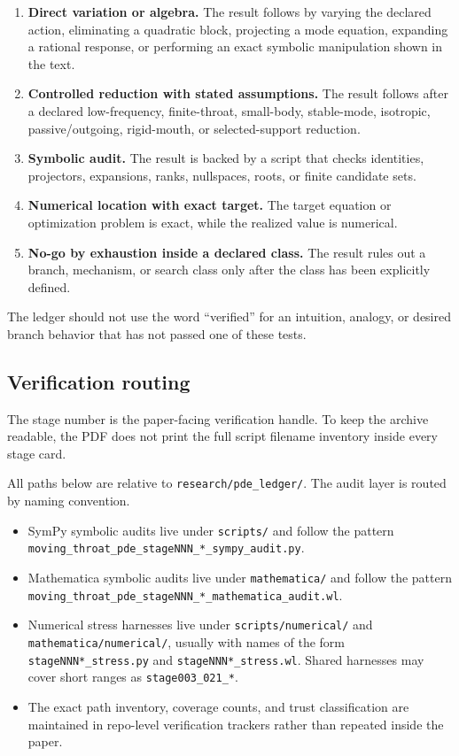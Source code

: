 \begin{enumerate}[leftmargin=2.2em]
  \item \textbf{Direct variation or algebra.}  The result follows by varying the declared action, eliminating a quadratic block, projecting a mode equation, expanding a rational response, or performing an exact symbolic manipulation shown in the text.
  \item \textbf{Controlled reduction with stated assumptions.}  The result follows after a declared low-frequency, finite-throat, small-body, stable-mode, isotropic, passive/outgoing, rigid-mouth, or selected-support reduction.
  \item \textbf{Symbolic audit.}  The result is backed by a script that checks identities, projectors, expansions, ranks, nullspaces, roots, or finite candidate sets.
  \item \textbf{Numerical location with exact target.}  The target equation or optimization problem is exact, while the realized value is numerical.
  \item \textbf{No-go by exhaustion inside a declared class.}  The result rules out a branch, mechanism, or search class only after the class has been explicitly defined.
\end{enumerate}

The ledger should not use the word ``verified'' for an intuition, analogy, or desired branch behavior that has not passed one of these tests.

\subsection{Verification routing}

The stage number is the paper-facing verification handle.  To keep the archive
readable, the PDF does not print the full script filename inventory inside every
stage card.

All paths below are relative to \nolinkurl{research/pde_ledger/}.  The audit
layer is routed by naming convention.
\begin{itemize}[leftmargin=2.2em]
  \item SymPy symbolic audits live under \nolinkurl{scripts/} and follow the
  pattern
  \nolinkurl{moving_throat_pde_stageNNN_*_sympy_audit.py}.
  \item Mathematica symbolic audits live under
  \nolinkurl{mathematica/} and follow the pattern
  \nolinkurl{moving_throat_pde_stageNNN_*_mathematica_audit.wl}.
  \item Numerical stress harnesses live under \nolinkurl{scripts/numerical/}
  and \nolinkurl{mathematica/numerical/}, usually with names of
  the form \nolinkurl{stageNNN*_stress.py} and
  \nolinkurl{stageNNN*_stress.wl}.  Shared harnesses may cover short ranges as
  \nolinkurl{stage003_021_*}.
  \item The exact path inventory, coverage counts, and trust classification are
  maintained in repo-level verification trackers rather than repeated inside the
  paper.
\end{itemize}

